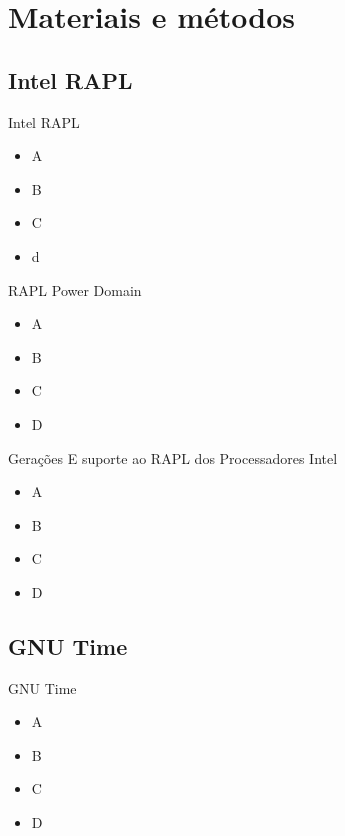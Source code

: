 \section{Materiais e métodos}

\subsection{Intel RAPL}
\begin{frame}{Intel RAPL}
    \begin{itemize}
        \item A
        \item B
        \item C 
        \item d
    \end{itemize}
\end{frame}

\begin{frame}{RAPL Power Domain}
    \begin{itemize}
        \item A
        \item B
        \item C 
        \item D 
    \end{itemize}
\end{frame}

\begin{frame}{Gerações E suporte ao RAPL dos Processadores Intel}
    \begin{itemize}
        \item A
        \item B
        \item C 
        \item D 
    \end{itemize}
\end{frame}


\subsection{GNU Time}
\begin{frame}{GNU Time}
    \begin{itemize}
        \item A
        \item B
        \item C 
        \item D 
    \end{itemize}
\end{frame}

